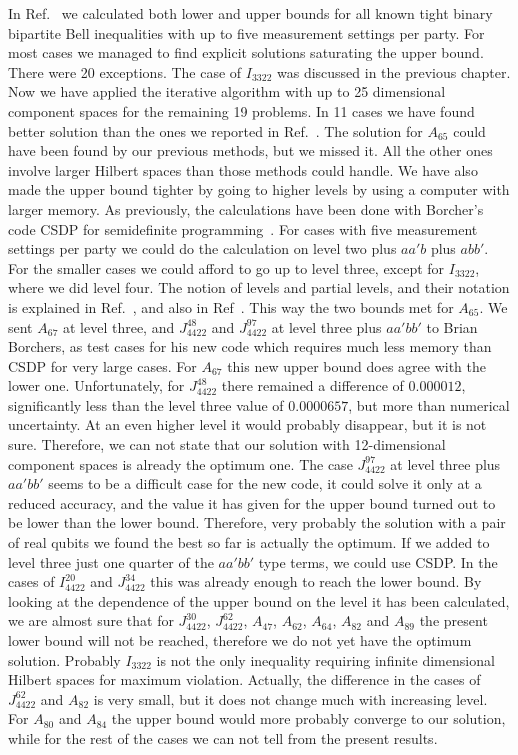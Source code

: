 In Ref.~\cite{PV09} we calculated both lower and upper bounds for all known tight binary bipartite Bell
inequalities with up to five measurement settings per party. For most cases we managed to
find explicit solutions saturating the upper bound. There were 20 exceptions. The case of
$I_{3322}$ was discussed in the previous chapter. Now we have applied the iterative algorithm
with up to 25 dimensional component spaces for the remaining 19 problems.
In 11 cases we have found better solution than the ones we reported in Ref.~\cite{PV09}. The solution for $A_{65}$ could have been found by our previous methods, but we missed it. All the other ones involve larger Hilbert spaces than those methods could handle. We have also
made the upper bound tighter by going to higher levels by using a computer with larger
memory. As previously, the calculations have been done with Borcher's code CSDP for
semidefinite programming~\cite{CSDP}.
For cases with five measurement settings per party we could do the calculation on level
two plus $aa'b$ plus $abb'$. For the smaller cases we could afford to go up to level
three, except for $I_{3322}$, where we did level four. The notion of levels and partial levels,
and their notation is explained in Ref.~\cite{NPA2}, and also in Ref~\cite{PV09}. This way the two bounds met for $A_{65}$. We sent $A_{67}$ at level three, and $J^{48}_{4422}$ and $J^{97}_{4422}$ at
level three plus $aa'bb'$ to Brian Borchers, as test cases for his new code which requires
much less memory than CSDP for very large cases. For $A_{67}$ this new upper bound does
agree with the lower one. Unfortunately, for $J^{48}_{4422}$ there remained a difference of
$0.000012$, significantly less than the level three value of $0.0000657$, but more than numerical
uncertainty. At an even higher level it would probably disappear, but it is not sure. Therefore,
we can not state that our solution with 12-dimensional component spaces is already the optimum one.
The case $J^{97}_{4422}$ at level three plus $aa'bb'$ seems to be a difficult case for the new
code, it could solve it only at a reduced accuracy, and the value it has given for the
upper bound turned out to be lower than the lower bound. Therefore, very probably the
solution with a pair of real qubits we found the best so far is actually the optimum.
If we added to level three just one quarter of the $aa'bb'$ type terms, we could use CSDP.
In the cases of $I^{20}_{4422}$ and $J^{34}_{4422}$ this was already enough to reach
the lower bound. By looking at the dependence of the upper bound on the level it has been
calculated, we are almost sure that for $J^{30}_{4422}$, $J^{62}_{4422}$, $A_{47}$,
$A_{62}$, $A_{64}$, $A_{82}$ and $A_{89}$ the present lower bound will not be reached,
therefore we do not yet have the optimum solution. Probably $I_{3322}$  is not the only
inequality requiring infinite dimensional Hilbert spaces for maximum violation. Actually, the
difference in the cases of $J^{62}_{4422}$ and $A_{82}$ is very small, but it does not
change much with increasing level. For $A_{80}$ and $A_{84}$ the upper bound would more
probably converge to our solution, while for the rest of the cases we can not tell from the
present results.
